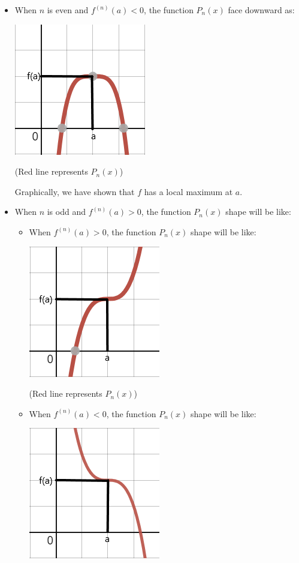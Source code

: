 \documentclass[12pt]{exam}
\begin{document}
\begin{enumerate}
\begin{enumerate}
\begin{itemize}
			    \item When $n$ is even and $f^{(n)}(a)<0$, the function $P_n(x)$ face downward as:
			        \begin{center}
			            \includegraphics[scale=0.75]{Downward-n}
			    
			            (Red line represents $P_n(x)$)
			        \end{center}
			        Graphically, we have shown that $f$ has a local maximum at $a$.
			     
		        \item When $n$ is odd and $f^{(n)}(a)>0$, the function $P_n(x)$ shape will be like:
		            \begin{itemize}
		                \item When $f^{(n)}(a)>0$, the function $P_n(x)$ shape will be like:
		                    \begin{center}
			                    \includegraphics[scale=0.75]{Odd-Positive}
			    
			                    (Red line represents $P_n(x)$)
			                \end{center}
		                \item When $f^{(n)}(a)<0$, the function $P_n(x)$ shape will be like:
		                    \begin{center}
			                    \includegraphics[scale=0.75]{Odd-Negative}
			    

\end{center}
\end{itemize}
\end{itemize}
\end{enumerate}
\end{enumerate}
\end{document}
